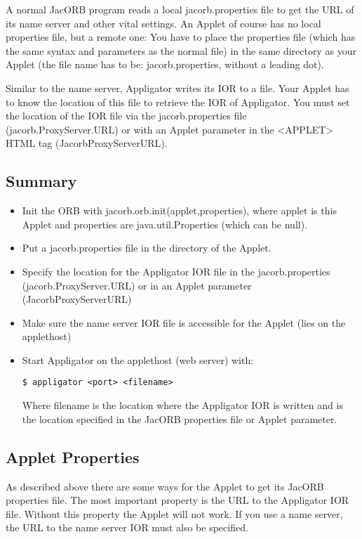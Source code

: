 \documentclass[12pt]{scrbook}
\begin{document}
A normal JacORB program reads a local jacorb.properties file to get
the URL of its name server and other vital settings. An Applet of
course has no local properties file, but a remote one: You have to
place the properties file (which has the same syntax and parameters as
the normal file) in the same directory as your Applet (the file name
has to be: jacorb.properties, without a leading dot).
 
Similar to the name server, Appligator writes its IOR to a file. Your
Applet has to know the location of this file to retrieve the IOR of
Appligator. You must set the location of the IOR file via the
jacorb.properties file (jacorb.ProxyServer.URL) or with an Applet
parameter in the <APPLET> HTML tag (JacorbProxyServerURL). 

\subsection{Summary}

\begin{itemize}
\item Init the ORB with jacorb.orb.init(applet,properties), where applet is
this Applet and properties are java.util.Properties (which can be
null).  
\item Put a jacorb.properties file in the directory of the Applet.
\item Specify the location for the Appligator IOR file in the
jacorb.properties (jacorb.ProxyServer.URL) or in an Applet parameter
(JacorbProxyServerURL) 
\item Make sure the name server IOR file is
accessible for the Applet (lies on the applethost)
\item Start Appligator on the applethost (web server) with: 

\verb+$ appligator <port> <filename>+

Where filename is the location where the Appligator IOR is written and is the location specified in the JacORB properties file or Applet parameter. 
\end{itemize}

\subsection{Applet Properties}

As described above there are some ways for the Applet to get its JacORB properties file. The most important property is the URL to the Appligator IOR file. Without this property the Applet will not work. If you use a name server, the URL to the name server IOR must also be specified.
\end{document}
